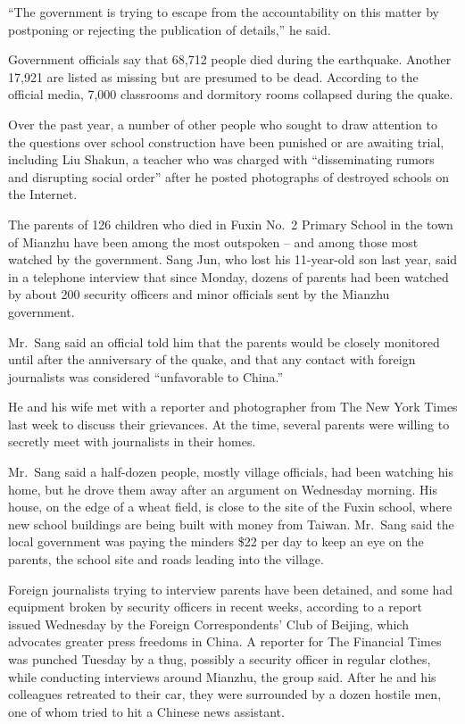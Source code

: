 \documentclass[12pt,a4paper,onecolumn]{article}
\begin{document}
``The government is trying to escape from the accountability on this matter by postponing or
rejecting the publication of details,'' he said.

Government officials say that 68,712 people died during the earthquake. Another 17,921 are listed as
missing but are presumed to be dead. According to the official media, 7,000 classrooms and dormitory
rooms collapsed during the quake.

Over the past year, a number of other people who sought to draw attention to the questions over
school construction have been punished or are awaiting trial, including Liu Shakun, a teacher who
was charged with ``disseminating rumors and disrupting social order'' after he posted photographs of
destroyed schools on the Internet.

The parents of 126 children who died in Fuxin No.~2 Primary School in the town of Mianzhu have been
among the most outspoken -- and among those most watched by the government. Sang Jun, who lost his
11-year-old son last year, said in a telephone interview that since Monday, dozens of parents had
been watched by about 200 security officers and minor officials sent by the Mianzhu government.

Mr.~Sang said an official told him that the parents would be closely monitored until after the
anniversary of the quake, and that any contact with foreign journalists was considered ``unfavorable
to China.''

He and his wife met with a reporter and photographer from The New York Times last week to discuss
their grievances. At the time, several parents were willing to secretly meet with journalists in
their homes.

Mr.~Sang said a half-dozen people, mostly village officials, had been watching his home, but he
drove them away after an argument on Wednesday morning. His house, on the edge of a wheat field, is
close to the site of the Fuxin school, where new school buildings are being built with money from
Taiwan. Mr.~Sang said the local government was paying the minders \$22 per day to keep an eye on the
parents, the school site and roads leading into the village.

Foreign journalists trying to interview parents have been detained, and some had equipment broken by
security officers in recent weeks, according to a report issued Wednesday by the Foreign
Correspondents' Club of Beijing, which advocates greater press freedoms in China. A reporter for The
Financial Times was punched Tuesday by a thug, possibly a security officer in regular clothes, while
conducting interviews around Mianzhu, the group said. After he and his colleagues retreated to their
car, they were surrounded by a dozen hostile men, one of whom tried to hit a Chinese news assistant.
\end{document}
